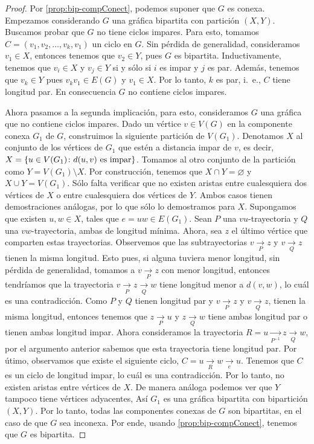 \begin{proof}
    Por \cref{prop:bip-compConect}, podemos suponer que $G$ es conexa. Empezamos
    considerando $G$ una gr\'afica bipartita con partici\'on $(X,Y)$. Buscamos
    probar que $G$ no tiene ciclos impares. Para esto, tomamos
    $C=(v_1,v_2,\dots, v_k,v_1)$ un ciclo en $G$. Sin p\'erdida de generalidad,
    consideramos $v_1 \in X$, entonces tenemos que $v_2 \in Y$, pues $G$ es
    bipartita. Inductivamente, tenemos que $v_i \in X$ y $v_j \in Y$ si y s\'olo
    si $i$ es impar y $j$ es par. Adem\'as, tenemos que $v_k \in Y$ pues $v_k
    v_1 \in E(G)$ y $v_1 \in X$. Por lo tanto, $k$ es par, i.~e., $C$ tiene
    longitud par. En consecuencia $G$ no contiene ciclos impares.

    Ahora pasamos a la segunda implicaci\'on, para esto, consideramos $G$ una
    gr\'afica que no contiene ciclos impares. Dado un v\'ertice $v \in V(G)$ en
    la componente conexa $G_1$ de $G$, construimos la siguiente partici\'on de
    $V(G_1)$. Denotamos $X$ al conjunto de los v\'ertices de $G_1$ que est\'en a
    distancia impar de $v$, es decir, $X = \{u \in V(G_1) \colon d(u,v)
    \textnormal{ es impar}\}$. Tomamos al otro conjunto de la partici\'on como
    $Y = V(G_1)\setminus X$. Por construcci\'on, tenemos que $X \cap Y =
    \varnothing$ y $X \cup Y = V(G_1)$. S\'olo falta verificar que no existen
    aristas entre cualesquiera dos v\'ertices de $X$ o entre cualesquiera dos
    v\'ertices de $Y$. Ambos casos tienen demostraciones an\'alogas, por lo que
    s\'olo lo demostramos para $X$. Supongamos que existen $u,w \in X$, tales
    que $e=uw \in E(G_1)$. Sean $P$ una $vu$-trayectoria y $Q$ una
    $vw$-trayectoria, ambas de longitud m\'inima. Ahora, sea $z$ el \'ultimo
    v\'ertice que comparten estas trayectorias. Observemos que las
    subtrayectorias $v \xrightarrow[P]{}z$ y $v \xrightarrow[Q]{}z$ tienen la
    misma longitud. Esto pues, si alguna tuviera menor longitud, sin p\'erdida
    de generalidad, tomamos a $v \xrightarrow[P]{}z$ con menor longitud,
    entonces tendr\'iamos que la trayectoria $v
    \xrightarrow[P]{}z\xrightarrow[Q]{}w$ tiene longitud menor a $d(v,w)$, lo
    cu\'al es una contradicci\'on. Como $P$ y $Q$ tienen longitud par y $v
    \xrightarrow[P]{}z$ y $v \xrightarrow[Q]{}z$, tienen la misma longitud,
    entonces tenemos que $z \xrightarrow[P]{}u$ y $z \xrightarrow[Q]{}w$ tiene
    ambas longitud par o tienen ambas longitud impar. Ahora consideramos la
    trayectoria $ R= u \xrightarrow[P^{-1}]{}z \xrightarrow[Q]{}w$, por el
    argumento anterior sabemos que esta trayectoria tiene longitud par. Por
    \'utimo, observamos que existe el siguiente ciclo,
    $C=u\xrightarrow[R]{}w\xrightarrow[e]{}u$. Tenemos que $C$ es un ciclo de
    longitud impar, lo cu\'al es una contradicci\'on. Por lo tanto, no existen
    aristas entre v\'ertices de $X$. De manera an\'aloga podemos ver que $Y$
    tampoco tiene v\'ertices adyacentes, As\'i $G_1$ es una gr\'afica bipartita
    con bipartici\'on $(X,Y)$. Por lo tanto, todas las componentes conexas de
    $G$ son bipartitas, en el caso de que $G$ sea inconexa. Por ende, usando
    \cref{prop:bip-compConect}, tenemos que $G$ es bipartita.
\end{proof}
    
